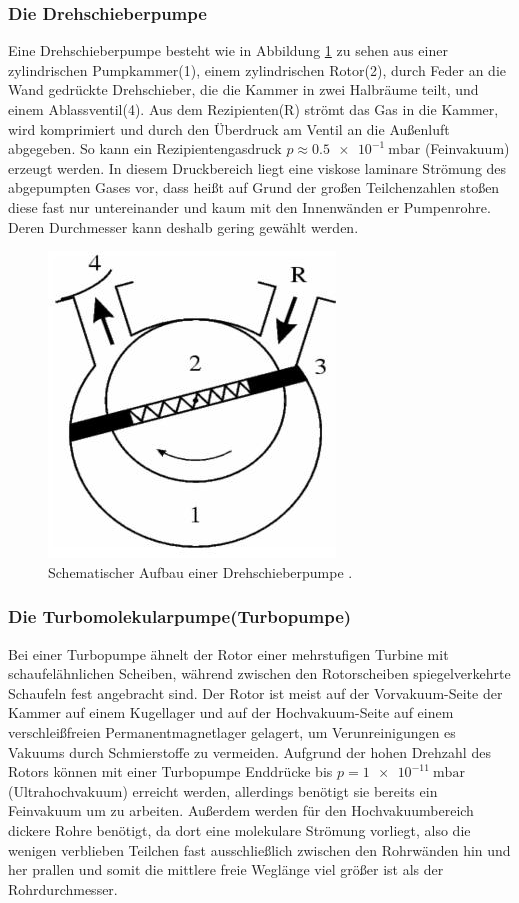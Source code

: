 \subsubsection{Die Drehschieberpumpe}
Eine Drehschieberpumpe besteht wie in Abbildung \ref{fig:DSP} zu sehen aus einer zylindrischen Pumpkammer(1), einem zylindrischen Rotor(2), durch Feder an die Wand gedrückte Drehschieber, die die Kammer in zwei Halbräume teilt, und einem Ablassventil(4). Aus dem Rezipienten(R) strömt das Gas in die Kammer, wird komprimiert und durch den Überdruck am Ventil an die Außenluft abgegeben.\cite{Jena}
So kann ein Rezipientengasdruck $p\approx \SI{0,5e-1}{\milli\bar}$ (Feinvakuum) erzeugt werden.
In diesem Druckbereich liegt eine viskose laminare Strömung des abgepumpten Gases vor, dass heißt auf Grund der großen Teilchenzahlen stoßen diese fast nur untereinander und kaum mit den Innenwänden er Pumpenrohre. Deren Durchmesser kann deshalb gering gewählt werden.
\begin{figure}
\centering
\includegraphics[scale=0.3]{content/images/Drehschieber.jpg}
\caption{Schematischer Aufbau einer Drehschieberpumpe \cite{Jena}.}
\label{fig:DSP}
\end{figure}
\subsubsection{Die Turbomolekularpumpe(Turbopumpe)}
Bei einer Turbopumpe ähnelt der Rotor einer mehrstufigen Turbine mit schaufelähnlichen Scheiben, während zwischen den Rotorscheiben spiegelverkehrte Schaufeln fest angebracht sind.
Der Rotor ist meist auf der Vorvakuum-Seite der Kammer auf einem Kugellager und auf der Hochvakuum-Seite auf einem verschleißfreien Permanentmagnetlager gelagert, um Verunreinigungen es Vakuums durch Schmierstoffe zu vermeiden.\cite{Pfeiffer} Aufgrund der hohen Drehzahl des Rotors können mit einer Turbopumpe Enddrücke bis $p=\SI{1e-11}{\milli\bar}$(Ultrahochvakuum) erreicht werden, allerdings benötigt sie bereits ein Feinvakuum um zu arbeiten. Außerdem werden für den Hochvakuumbereich dickere Rohre benötigt, da dort eine molekulare Strömung vorliegt, also die wenigen verblieben Teilchen fast ausschließlich zwischen den Rohrwänden hin und her prallen und somit die mittlere freie Weglänge viel größer ist als der Rohrdurchmesser.

